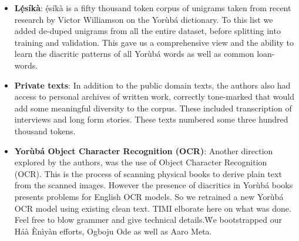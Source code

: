 \documentclass{article} %
\begin{document}
\begin{itemize}
\item \textbf{L\d{\'e}s{\'i}k{\`a}}: \d{\'e}s{\'i}k{\`a} is a fifty thousand token corpus of unigrams taken from recent research by Victor Williamson on the Yor{\`u}b{\'a} dictionary. To this list we added de-duped unigrams from all the entire dataset, before splitting into training and validation. This gave us a comprehensive view and the ability to learn the diacritic patterns of all Yor{\`u}b{\'a} words as well as common loan-words.

\item \textbf{Private texts}: In addition to the public domain texts, the authors also had access to personal archives of written work, correctly tone-marked that would add some meaningful diversity to the corpus. These included transcription of interviews and long form stories. These texts numbered some three hundred thousand tokens.

\item \textbf{{Yor{\`u}b{\'a} Object Character Recognition (OCR)}}: Another direction explored by the authors, was the use of Object Character Recognition (OCR).  This is the process of scanning physical books to derive plain text from the scanned images. However the presence of diacritics in Yor{\`u}b{\'a} books presents problems for English OCR models. So we retrained a new Yor{\`u}b{\'a} OCR model using existing clean text. TIMI elborate here on what was done. Feel free to blow grammer and give technical details.\. We bootstrapped our Háà Ènìyàn efforts, Ogboju Ode as well as Aaro Meta.
\end{itemize}
\end{document}
